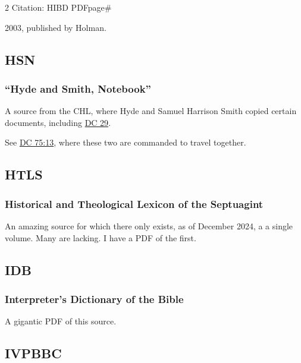 \begin{multicols}{2}
			Citation:
				HIBD PDFpage\#
				
				2003, published by Holman. 
	
	\subsection*{HSN}
		\label{HSN}
	
		\subsubsection*{``Hyde and Smith, Notebook''}
		
			A source from the CHL, where Hyde and Samuel Harrison Smith copied certain documents, including \hyperref[DC29]{DC 29}.
			
			See \hyperref[DC75-13]{DC 75:13}, where these two are commanded to travel together.
			
	\subsection*{HTLS}
	
		\subsubsection*{Historical and Theological Lexicon of the Septuagint}
		
			An amazing source for which there only exists, as of December 2024, a a single volume. Many are lacking. I have a PDF of the first.
			
	\subsection*{IDB}
	
		\subsubsection*{Interpreter's Dictionary of the Bible}
		
			A gigantic PDF of this source.
			
	\subsection*{IVPBBC}
	

\end{multicols}
